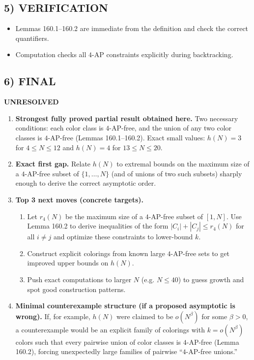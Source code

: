 \subsection*{5) VERIFICATION}
\begin{itemize}
\item Lemmas 160.1--160.2 are immediate from the definition and check the correct quantifiers.
\item Computation checks all $4$-AP constraints explicitly during backtracking.
\end{itemize}

\subsection*{6) FINAL}
\textbf{UNRESOLVED}

\begin{enumerate}
\item[(i)] \textbf{Strongest fully proved partial result obtained here.}
Two necessary conditions: each color class is $4$-AP-free, and the union of any two color classes is $4$-AP-free (Lemmas 160.1--160.2). Exact small values: $h(N)=3$ for $4\le N\le 12$ and $h(N)=4$ for $13\le N\le 20$.

\item[(ii)] \textbf{Exact first gap.}
Relate $h(N)$ to extremal bounds on the maximum size of a $4$-AP-free subset of $\{1,\dots,N\}$ (and of unions of two such subsets) sharply enough to derive the correct asymptotic order.

\item[(iii)] \textbf{Top 3 next moves (concrete targets).}
\begin{enumerate}
\item Let $r_4(N)$ be the maximum size of a $4$-AP-free subset of $[1,N]$. Use Lemma 160.2 to derive inequalities of the form $|C_i|+|C_j|\le r_4(N)$ for all $i\ne j$ and optimize these constraints to lower-bound $k$.
\item Construct explicit colorings from known large $4$-AP-free sets to get improved upper bounds on $h(N)$.
\item Push exact computations to larger $N$ (e.g. $N\le 40$) to guess growth and spot good construction patterns.
\end{enumerate}

\item[(iv)] \textbf{Minimal counterexample structure (if a proposed asymptotic is wrong).}
If, for example, $h(N)$ were claimed to be $o(N^{\beta})$ for some $\beta>0$, a counterexample would be an explicit family of colorings with $k=o(N^{\beta})$ colors such that every pairwise union of color classes is $4$-AP-free (Lemma 160.2), forcing unexpectedly large families of pairwise ``$4$-AP-free unions.''
\end{enumerate}



